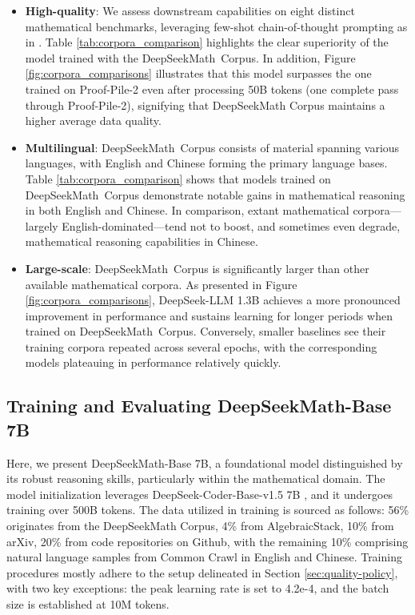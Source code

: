 \begin{itemize}[topsep=0pt]
    \item \textbf{High-quality}:
    We assess downstream capabilities on eight distinct mathematical benchmarks, leveraging few-shot chain-of-thought prompting as in \cite{cot}. Table \ref{tab:corpora_comparison} highlights the clear superiority of the model trained with the DeepSeekMath~Corpus. In addition, Figure \ref{fig:corpora_comparisons} illustrates that this model surpasses the one trained on Proof-Pile-2 even after processing 50B tokens (one complete pass through Proof-Pile-2), signifying that DeepSeekMath Corpus maintains a higher average data quality.
    \item \textbf{Multilingual}:
    DeepSeekMath~Corpus consists of material spanning various languages, with English and Chinese forming the primary language bases. Table \ref{tab:corpora_comparison} shows that models trained on DeepSeekMath~Corpus demonstrate notable gains in mathematical reasoning in both English and Chinese. In comparison, extant mathematical corpora—largely English-dominated—tend not to boost, and sometimes even degrade, mathematical reasoning capabilities in Chinese.
    \item \textbf{Large-scale}:
    DeepSeekMath~Corpus is significantly larger than other available mathematical corpora. As presented in Figure \ref{fig:corpora_comparisons}, DeepSeek-LLM 1.3B achieves a more pronounced improvement in performance and sustains learning for longer periods when trained on DeepSeekMath~Corpus. Conversely, smaller baselines see their training corpora repeated across several epochs, with the corresponding models plateauing in performance relatively quickly.
\end{itemize}

\subsection{Training and Evaluating DeepSeekMath-Base 7B}

Here, we present DeepSeekMath-Base 7B, a foundational model distinguished by its robust reasoning skills, particularly within the mathematical domain. The model initialization leverages DeepSeek-Coder-Base-v1.5 7B \citep{deepseek-coder}, and it undergoes training over 500B tokens. The data utilized in training is sourced as follows: 56\% originates from the DeepSeekMath Corpus, 4\% from AlgebraicStack, 10\% from arXiv, 20\% from code repositories on Github, with the remaining 10\% comprising natural language samples from Common Crawl in English and Chinese. Training procedures mostly adhere to the setup delineated in Section \ref{sec:quality-policy}, with two key exceptions: the peak learning rate is set to 4.2e-4, and the batch size is established at 10M tokens.

